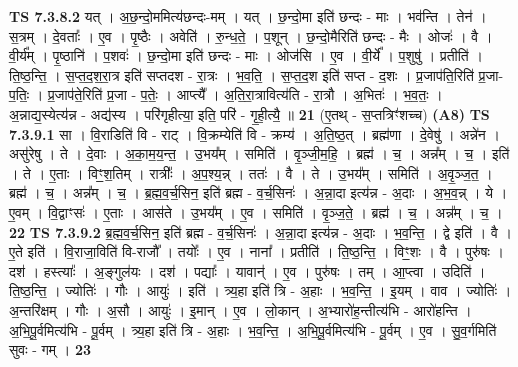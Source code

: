 \documentclass[17pt]{extarticle}
\begin{document}
                  \newline
                                \textbf{ TS 7.3.8.2} \newline
                  यत् । अ॒छ॒न्दो॒ममित्य॑छन्दः-मम् । यत् । छ॒न्दो॒मा इति॑ छन्दः - माः । भव॑न्ति । तेन॑ । स॒त्रम् । दे॒वताः᳚ । ए॒व । पृ॒ष्ठैः । अवेति॑ । रु॒न्ध॒ते॒ । प॒शून् । छ॒न्दो॒मैरिति॑ छन्दः - मैः । ओजः॑ । वै । वी॒र्य᳚म् । पृ॒ष्ठानि॑ । प॒शवः॑ । छ॒न्दो॒मा इति॑ छन्दः - माः । ओज॑सि । ए॒व । वी॒र्ये᳚ । प॒शुषु॑ । प्रतीति॑ । ति॒ष्ठ॒न्ति॒ । स॒प्त॒द॒श॒रा॒त्र इति॑ सप्तदश - रा॒त्रः । भ॒व॒ति॒ । स॒प्त॒द॒श इति॑ सप्त - द॒शः । प्र॒जाप॑ति॒रिति॑ प्र॒जा-प॒तिः॒ । प्र॒जाप॑ते॒रिति॑ प्र॒जा - प॒तेः॒ । आप्त्यै᳚ । अ॒ति॒रा॒त्रावित्य॑ति - रा॒त्रौ । अ॒भितः॑ । भ॒व॒तः॒ । अ॒न्नाद्य॒स्येत्य॑न्न - अद्य॑स्य । परि॑गृहीत्या॒ इति॒ परि॑ - गृ॒ही॒त्यै॒ ॥ \textbf{  21} \newline
                  \newline
                      (ए॒तथ् - स॒प्तत्रिꣳ॑शच्च)  \textbf{(A8)} \newline \newline
                                \textbf{ TS 7.3.9.1} \newline
                  सा । वि॒राडिति॑ वि - राट् । वि॒क्रम्येति॑ वि - क्रम्य॑ । अ॒ति॒ष्ठ॒त् । ब्रह्म॑णा । दे॒वेषु॑ । अन्ने॑न । असु॑रेषु । ते । दे॒वाः । अ॒का॒म॒य॒न्त॒ । उ॒भय᳚म् । समिति॑ । वृ॒ञ्जी॒म॒हि॒ । ब्रह्म॑ । च॒ । अन्न᳚म् । च॒ । इति॑ । ते । ए॒ताः । विꣳ॒॒श॒तिम् । रात्रीः᳚ । अ॒प॒श्य॒न्न् । ततः॑ । वै । ते । उ॒भय᳚म् । समिति॑ । अ॒वृ॒ञ्ज॒त॒ । ब्रह्म॑ । च॒ । अन्न᳚म् । च॒ । ब्र॒ह्म॒व॒र्च॒सिन॒ इति॑ ब्रह्म - व॒र्च॒सिनः॑ । अ॒न्ना॒दा इत्य॑न्न - अ॒दाः । अ॒भ॒व॒न्न् । ये । ए॒वम् । वि॒द्वाꣳसः॑ । ए॒ताः । आस॑ते । उ॒भय᳚म् । ए॒व । समिति॑ । वृ॒ञ्ज॒ते॒ । ब्रह्म॑ । च॒ । अन्न᳚म् । च॒ । \textbf{  22} \newline
                  \newline
                                \textbf{ TS 7.3.9.2} \newline
                  ब्र॒ह्म॒व॒र्च॒सिन॒ इति॑ ब्रह्म - व॒र्च॒सिनः॑ । अ॒न्ना॒दा इत्य॑न्न - अ॒दाः । भ॒व॒न्ति॒ । द्वे इति॑ । वै । ए॒ते इति॑ । वि॒राजा॒विति॑ वि-राजौ᳚ । तयोः᳚ । ए॒व । नाना᳚ । प्रतीति॑ । ति॒ष्ठ॒न्ति॒ । विꣳ॒॒शः । वै । पुरु॑षः । दश॑ । हस्त्याः᳚ । अ॒ङ्गुल॑यः । दश॑ । पद्याः᳚ । यावान्॑ । ए॒व । पुरु॑षः । तम् । आ॒प्त्वा । उदिति॑ । ति॒ष्ठ॒न्ति॒ । ज्योतिः॑ । गौः । आयुः॑ । इति॑ । त्र्य॒हा इति॑ त्रि - अ॒हाः । भ॒व॒न्ति॒ । इ॒यम् । वाव । ज्योतिः॑ । अ॒न्तरि॑क्षम् । गौः । अ॒सौ । आयुः॑ । इ॒मान् । ए॒व । लो॒कान् । अ॒भ्यारो॑ह॒न्तीत्य॑भि - आरो॑हन्ति । अ॒भि॒पू॒र्वमित्य॑भि - पू॒र्वम् । त्र्य॒हा इति॑ त्रि - अ॒हाः । भ॒व॒न्ति॒ । अ॒भि॒पू॒र्वमित्य॑भि - पू॒र्वम् । ए॒व । सु॒व॒र्गमिति॑ सुवः - गम् । \textbf{  23} \newline
\end{document}
